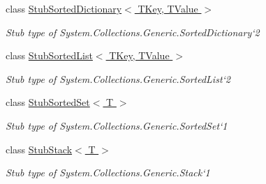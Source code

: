 \begin{DoxyCompactItemize}
class \hyperlink{class_system_1_1_collections_1_1_generic_1_1_fakes_1_1_stub_sorted_dictionary_3_01_t_key_00_01_t_value_01_4}{Stub\-Sorted\-Dictionary$<$ T\-Key, T\-Value $>$}
\begin{DoxyCompactList}\small\item\em Stub type of System.\-Collections.\-Generic.\-Sorted\-Dictionary`2\end{DoxyCompactList}\item 
class \hyperlink{class_system_1_1_collections_1_1_generic_1_1_fakes_1_1_stub_sorted_list_3_01_t_key_00_01_t_value_01_4}{Stub\-Sorted\-List$<$ T\-Key, T\-Value $>$}
\begin{DoxyCompactList}\small\item\em Stub type of System.\-Collections.\-Generic.\-Sorted\-List`2\end{DoxyCompactList}\item 
class \hyperlink{class_system_1_1_collections_1_1_generic_1_1_fakes_1_1_stub_sorted_set_3_01_t_01_4}{Stub\-Sorted\-Set$<$ T $>$}
\begin{DoxyCompactList}\small\item\em Stub type of System.\-Collections.\-Generic.\-Sorted\-Set`1\end{DoxyCompactList}\item 
class \hyperlink{class_system_1_1_collections_1_1_generic_1_1_fakes_1_1_stub_stack_3_01_t_01_4}{Stub\-Stack$<$ T $>$}
\begin{DoxyCompactList}\small\item\em Stub type of System.\-Collections.\-Generic.\-Stack`1\end{DoxyCompactList}\end{DoxyCompactItemize}
